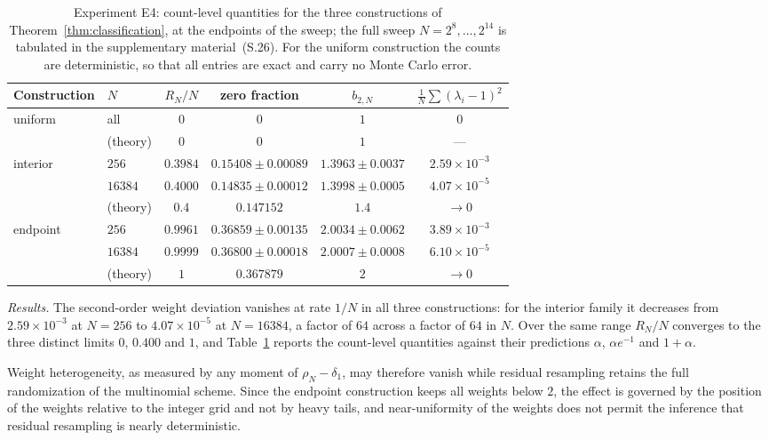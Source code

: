 \documentclass[lettersize,journal]{IEEEtran}
\theoremstyle{remark}
\begin{document}
\begin{table}[!t]
\renewcommand{\arraystretch}{1.25}
\caption{Experiment E4: count-level quantities for the three constructions of
  Theorem~\ref{thm:classification}, at the endpoints of the sweep; the full
  sweep $N=2^8,\dots,2^{14}$ is tabulated in the supplementary material~(S.26). For
  the uniform construction the counts are
  deterministic, so that all entries are exact and carry no Monte Carlo
  error.}
\label{tab:e4}
\centering
\begin{tabular}{llcccc}
\toprule
Construction & $N$ & $R_N/N$ & zero fraction & $b_{2,N}$
             & $\frac1N\sum(\lambda_i-1)^2$ \\
\midrule
uniform   & all      & $0$ & $0$ & $1$ & $0$ \\
          & (theory) & $0$ & $0$ & $1$ & --- \\
\addlinespace[2pt]
interior  & $256$    & $0.3984$ & $0.15408\pm0.00089$
                     & $1.3963\pm0.0037$ & $2.59\times10^{-3}$ \\
          & $16384$  & $0.4000$ & $0.14835\pm0.00012$
                     & $1.3998\pm0.0005$ & $4.07\times10^{-5}$ \\
          & (theory) & $0.4$    & $0.147152$ & $1.4$ & $\to0$ \\
\addlinespace[2pt]
endpoint  & $256$    & $0.9961$ & $0.36859\pm0.00135$
                     & $2.0034\pm0.0062$ & $3.89\times10^{-3}$ \\
          & $16384$  & $0.9999$ & $0.36800\pm0.00018$
                     & $2.0007\pm0.0008$ & $6.10\times10^{-5}$ \\
          & (theory) & $1$      & $0.367879$ & $2$ & $\to0$ \\
\bottomrule
\end{tabular}
\end{table}

\emph{Results.} The second-order weight deviation vanishes at rate $1/N$ in
all three constructions: for the interior family it decreases from
$2.59\times10^{-3}$ at $N=256$ to $4.07\times10^{-5}$ at $N=16384$, a factor of
$64$ across a factor of $64$ in $N$. Over the same range $R_N/N$ converges to
the three distinct limits $0$, $0.400$ and $1$, and Table~\ref{tab:e4} reports
the count-level quantities against their predictions $\alpha$, $\alpha e^{-1}$
and $1+\alpha$.

Weight heterogeneity, as measured by any moment of $\rho_N-\delta_1$, may
therefore vanish while residual resampling retains the full randomization of
the multinomial scheme. Since the endpoint construction keeps all weights below
$2$, the effect is governed by the position of the weights relative to the
integer grid and not by heavy tails, and near-uniformity of the weights does
not permit the inference that residual resampling is nearly deterministic.
\end{document}
